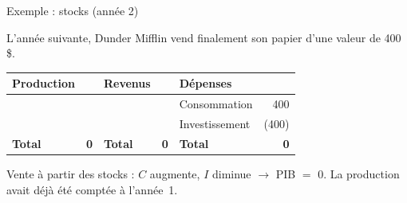 \documentclass[aspectratio=169]{beamer}
\begin{document}
\begin{frame}[t]{Exemple : stocks (année 2)}\examtag
   \footnotesize
   \begin{tcolorbox}[
      colback=white, colframe=HECnavy, colbacktitle=HECnavy,
      title=\textbf{Exemple}, fonttitle=\footnotesize, boxrule=0.5pt, arc=8pt,
      top=3pt, bottom=3pt, left=6pt, right=6pt
   ]
      L'année suivante, Dunder Mifflin vend finalement son papier d'une valeur de 400\,\$.
      \vspace{0.1cm}

      \renewcommand{\arraystretch}{1.1}
      \centering
      \begin{tabularx}{\linewidth}{X r >{\hspace{0.15cm}}X r >{\hspace{0.15cm}}X r}
         \rowcolor{HECnavy!10}
         \textbf{Production} & & \textbf{Revenus} & & \textbf{Dépenses} & \\
         \hline
         & & & & Consommation & 400 \\
         & & & & Investissement & (400) \\
         \hline
         \textbf{Total} & \textbf{0} & \textbf{Total} & \textbf{0} & \textbf{Total} & \textbf{0}
      \end{tabularx}
   \end{tcolorbox}
   \vspace{0.05cm}
   \begin{keyinsight}
      Vente à partir des stocks : $C$ augmente, $I$ diminue $\to$ PIB $=$ 0. La production avait déjà été comptée à l'année~1.
   \end{keyinsight}
\end{frame}
\end{document}

